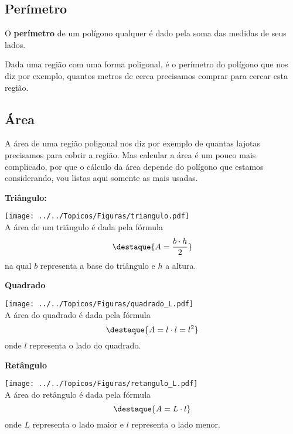 \subsection{Perímetro}

\vskip0.3cm
 \colorbox{amarelo}{
 \begin{minipage}{0.9\linewidth}
 \begin{center}
  O \textbf{perímetro} de um polígono qualquer é dado pela soma das medidas de seus lados.
 \end{center}
 \end{minipage}}
 \vskip0.3cm


Dada uma região com uma forma poligonal, é o perímetro do polígono que nos diz por exemplo, quantos metros de cerca precisamos comprar para cercar esta região.

\subsection{Área}

A área de uma região poligonal nos diz por exemplo de quantas lajotas precisamos para cobrir a região. Mas calcular a área é um pouco mais complicado, por que o cálculo da área depende do polígono que estamos considerando, vou listas aqui somente as mais usadas.

\textbf{Triângulo:}
\begin{multicols}{2}

\texttt{[image: ../../Topicos/Figuras/triangulo.pdf]} \\
A área de um triângulo é dada pela fórmula
\[\destaque{A= \frac{b \cdot h}{2}}\]
na qual $b$ representa a base do triângulo e $h$ a altura.
\end{multicols}

\textbf{Quadrado}
\begin{multicols}{2}
\texttt{[image: ../../Topicos/Figuras/quadrado\_L.pdf]} \\
A área do quadrado é dada pela fórmula
\[\destaque{A= l \cdot l= l^2}\]
onde $l$ representa o lado do quadrado.
\end{multicols}

\textbf{Retângulo}
\begin{multicols}{2}
\texttt{[image: ../../Topicos/Figuras/retangulo\_L.pdf]} \\
A área do retângulo é dada pela fórmula
\[\destaque{A= L \cdot l}\]
onde $L$ representa o lado maior e $l$ representa o lado menor.
\end{multicols}

